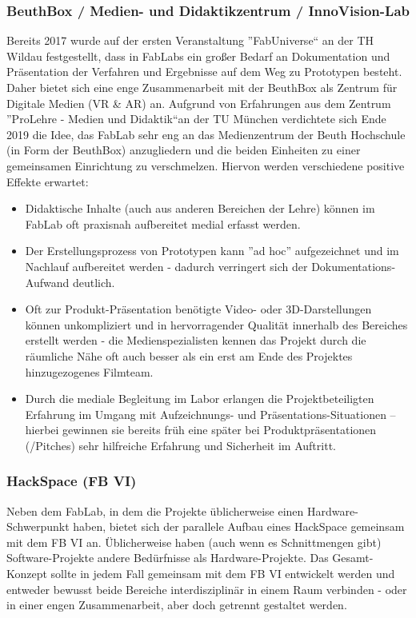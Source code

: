 \documentclass[parskip=half,headsepline,footsepline,titlepage]{scrartcl}
\begin{document}
\subsubsection{BeuthBox / Medien- und Didaktikzentrum / InnoVision-Lab}
Bereits 2017 wurde auf der ersten Veranstaltung ''FabUniverse`` an der TH Wildau festgestellt, dass in FabLabs ein großer Bedarf an Dokumentation und Präsentation der Verfahren und Ergebnisse auf dem Weg zu Prototypen besteht. Daher bietet sich eine enge Zusammenarbeit mit der BeuthBox als Zentrum für Digitale Medien (VR \& AR) an.
Aufgrund von Erfahrungen aus dem Zentrum ''ProLehre - Medien und Didaktik``an der TU München verdichtete sich Ende 2019 die Idee, das FabLab sehr eng an das Medienzentrum der Beuth Hochschule (in Form der BeuthBox) anzugliedern und die beiden Einheiten zu einer gemeinsamen Einrichtung zu verschmelzen. Hiervon werden verschiedene positive Effekte erwartet:
\begin{itemize}
 \item Didaktische Inhalte (auch aus anderen Bereichen der Lehre) können im FabLab oft praxisnah aufbereitet medial erfasst werden.
 \item Der Erstellungsprozess von Prototypen kann ''ad hoc'' aufgezeichnet und im Nachlauf aufbereitet werden - dadurch verringert sich der Dokumentations-Aufwand deutlich.
 \item Oft zur Produkt-Präsentation benötigte Video- oder 3D-Darstellungen können unkompliziert und in hervorragender Qualität innerhalb des Bereiches erstellt werden - die Medienspezialisten kennen das Projekt durch die räumliche Nähe oft auch besser als ein erst am Ende des Projektes hinzugezogenes Filmteam.
 \item Durch die mediale Begleitung im Labor erlangen die Projektbeteiligten Erfahrung im Umgang mit Aufzeichnungs- und Präsentations-Situationen -- hierbei gewinnen sie bereits früh eine später bei Produktpräsentationen (/Pitches) sehr hilfreiche Erfahrung und Sicherheit im Auftritt.
\end{itemize}


\subsubsection{HackSpace (FB VI)}
Neben dem FabLab, in dem die Projekte üblicherweise einen Hardware-Schwerpunkt haben, bietet sich der parallele Aufbau eines HackSpace gemeinsam mit dem FB VI an. Üblicherweise haben (auch wenn es Schnittmengen gibt) Software-Projekte andere Bedürfnisse als Hardware-Projekte. Das Gesamt-Konzept sollte in jedem Fall gemeinsam mit dem FB VI entwickelt werden und entweder bewusst beide Bereiche interdisziplinär in einem Raum verbinden - oder in einer engen Zusammenarbeit, aber doch getrennt gestaltet werden.
\end{document}
